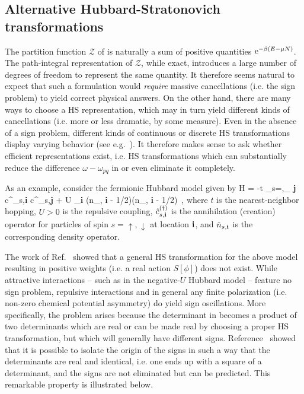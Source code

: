 \documentclass[../main.tex]{subfiles}
\begin{document}
\subsection{Alternative Hubbard-Stratonovich transformations\label{sect:AlternativeHS}}

The partition function $\mathcal Z$ of  is naturally a sum of positive quantities ${\rm e}^{-\beta(E - \mu N)}$.
The path-integral representation of $\mathcal Z$, while exact, introduces a large number of degrees of freedom to represent the
same quantity. It therefore seems natural to expect that such a formulation would {\it require} massive cancellations
(i.e. the sign problem) to yield correct physical answers. On the other hand, there are many ways to choose a HS representation,
which may in turn yield different kinds of cancellations (i.e. more or less dramatic, by some measure).
 Even in the absence of a sign problem, different kinds of continuous or discrete HS transformations display varying behavior
(see e.g.~\cite{PhysRevB.28.4059, PhysRevC.78.024001}).
It therefore makes sense to ask whether efficient representations exist, i.e. HS transformations which can substantially reduce the
difference $\omega - \omega_{pq}$ in  or even eliminate it completely.

As an example, consider the fermionic Hubbard model given by
%
\beq
  \label{Eq:HubbardH}
  \hat H = -t \sum_{s=\uparrow,\downarrow}\sum_{ {\bf j}\rangle} \hat c^\dagger_{s,\bf i} \hat c^{}_{s,\bf j} + U \sum_{{\bf i}} (\hat n_{\uparrow, {\bf i}} - 1/2)(\hat n_{\downarrow, {\bf i}} - 1/2)\, ,
\eeq
%
where $t$ is the nearest-neighbor hopping, $U > 0$ is the repulsive coupling, $\hat c^{(\dagger)}_{s,\bf i}$ is the annihilation (creation) operator for particles of spin $s=\uparrow,\downarrow$ at location ${\bf i}$, and $\hat n_{s,{\bf i}}$ is the corresponding density operator.

The work of Ref.~\cite{PhysRevB.48.589} showed that a general HS transformation for the above model resulting in positive weights
(i.e. a real action $S[\phi]$) does not exist. While attractive interactions -- such as in the negative-$U$ Hubbard model -- feature no sign problem,
repulsive interactions and in general any finite polarization (i.e. non-zero chemical potential asymmetry) do yield sign oscillations.
More specifically, the problem arises because the determinant in  becomes a product of two determinants which are
real or can be made real by choosing a proper HS transformation, but which will generally have different signs.
Reference~\cite{PhysRevB.48.589} showed that it is possible to isolate the origin of the signs in such a way that the determinants are real and
identical, i.e. one ends up with a square of a determinant, and the signs are not eliminated but can be predicted. This remarkable property is
illustrated below.
\end{document}
